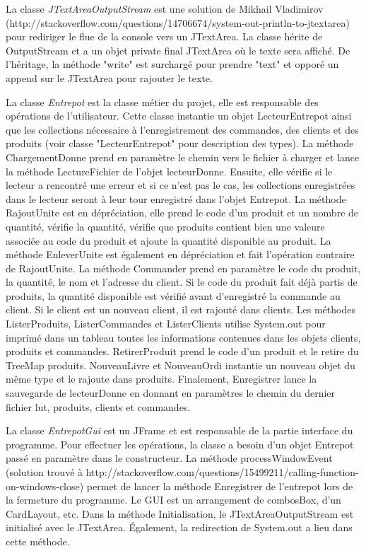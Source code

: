 \documentclass[11pt, french]{article} %
\begin{document}
La classe \textit{JTextAreaOutputStream} est une solution de Mikhail Vladimirov  (http://stackoverflow.com/questions/14706674/system-out-println-to-jtextarea) pour rediriger le flue de la console vers un JTextArea. La classe hérite de OutputStream et a un objet private final JTextArea où le texte sera affiché. De l'héritage, la méthode "write" est surchargé pour prendre "text" et opporé un append sur le JTextArea pour rajouter le texte.
\newline

La classe \textit{Entrepot} est la classe métier du projet, elle est responsable des opérations de l'utilisateur. Cette classe instantie un objet LecteurEntrepot ainsi que les collections nécessaire à l'enregistrement des commandes, des clients et des produits (voir classe "LecteurEntrepot" pour description des types). La méthode ChargementDonne prend en paramètre le chemin vers le fichier à charger et lance la méthode LectureFichier de l'objet lecteurDonne. Ensuite, elle vérifie si le lecteur a rencontré une erreur et si ce n'est pas le cas, les collections enregistrées dans le lecteur seront à leur tour enregistré dans l'objet Entrepot. La méthode RajoutUnite est en dépréciation, elle prend le code d'un produit et un nombre de quantité, vérifie la quantité, vérifie que produits contient bien une valeure associée au code du produit et ajoute la quantité disponible au produit. La méthode EnleverUnite est également en dépréciation et fait l'opération contraire de RajoutUnite. La méthode Commander prend en paramètre le code du produit, la quantité, le nom et l'adresse du client. Si le code du produit fait déjà partis de produits, la quantité disponible est vérifié avant d'enregistré la commande au client. Si le client est un nouveau client, il est rajouté dans clients. Les méthodes ListerProduits, ListerCommandes et ListerClients utilise System.out pour imprimé dans un tableau toutes les informations contenues dans les objets clients, produits et commandes. RetirerProduit prend le code d'un produit et le retire du TreeMap produits. NouveauLivre et NouveauOrdi instantie un nouveau objet du même type et le rajoute dans produits. Finalement, Enregistrer lance la sauvegarde de lecteurDonne en donnant en paramètres le chemin du dernier fichier lut, produits, clients et commandes.
\newline

La classe \textit{EntrepotGui} est un JFrame et est responsable de la partie interface du programme. Pour effectuer les opérations, la classe a besoin d'un objet Entrepot passé en paramètre dans le constructeur. La méthode processWindowEvent (solution trouvé à http://stackoverflow.com/questions/15499211/calling-function-on-windows-close) permet de lancer la méthode Enregistrer de l'entrepot lors de la fermeture du programme. Le GUI est un arrangement de combosBox, d'un CardLayout, etc. Dans la méthode Initialisation, le JTextAreaOutputStream est initialisé avec le JTextArea. Également, la redirection de System.out a lieu dans cette méthode.
\newline
\end{document}
